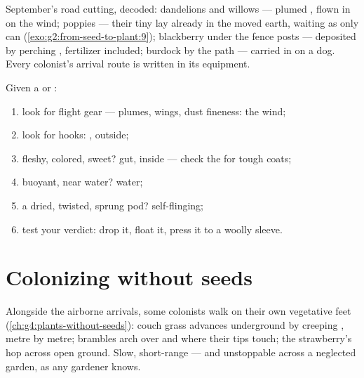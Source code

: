 \begin{example}\label{ex:g6:how-plants-spread:roadside}
September's road cutting, decoded: dandelions and willows ---
plumed , flown in on the wind; poppies --- their tiny
 lay already in the moved earth, waiting as only 
can (\cref{exo:g2:from-seed-to-plant:9}); blackberry
 under the fence posts --- deposited by perching
, fertilizer included; burdock by the path --- carried
in on a dog. Every colonist's arrival route is written in
its equipment.
\end{example}

\begin{method}\label{met:g6:how-plants-spread:name}
Given a  or :
\begin{enumerate}
  \item look for flight gear --- plumes, wings, dust
        fineness: the wind;
  \item look for hooks:  , outside;
  \item fleshy, colored, sweet?  gut, inside ---
        check the  for tough coats;
  \item buoyant, near water? water;
  \item a dried, twisted, sprung pod? self-flinging;
  \item test your verdict: drop it, float it, press it to a
        woolly sleeve.
\end{enumerate}
\end{method}

\section{Colonizing without seeds}

\begin{example}\label{ex:g6:how-plants-spread:vegetative}
Alongside the airborne arrivals, some colonists walk on
their own vegetative feet
(\cref{ch:g4:plants-without-seeds}): couch grass advances
underground by creeping , metre by metre; brambles arch
over and  where their tips touch; the strawberry's
 hop across open ground. Slow, short-range --- and
unstoppable across a neglected garden, as any gardener
knows.
\end{example}

